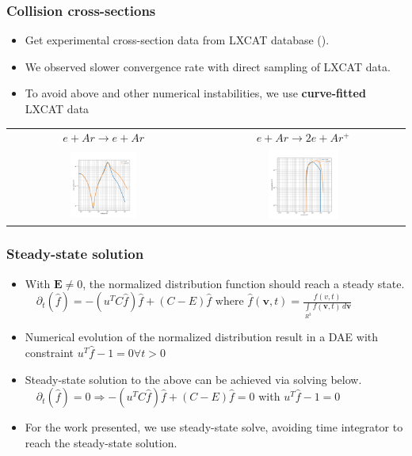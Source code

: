 \documentclass[mathserif, aspectratio=169]{beamer}
\newcommand{\vect}[1]{\boldsymbol{#1}}
\newcommand{\myint}{\int\limits}
\newcommand{\diff}[1]{\, d#1}
\begin{document}
\begin{frame}
	\frametitle{Collision cross-sections}
	\begin{itemize}
		\item Get experimental cross-section data from LXCAT database (). 
		\item We observed slower convergence rate with direct sampling of LXCAT data. 
		\item To avoid above and other numerical instabilities, we use \textbf{curve-fitted} LXCAT data%
	\end{itemize}
	\begin{center}
		\begin{tabular}{cc}
			$e + Ar \rightarrow e + Ar $ & $e + Ar \rightarrow 2e + Ar^+ $ \\
			\includegraphics[width=0.36\textwidth]{fig/g0.png} &  \includegraphics[width=0.36\textwidth]{fig/g2.png}
		\end{tabular}	
	\end{center}
\end{frame}


\begin{frame}
	\frametitle{Steady-state solution}
	\begin{itemize}
		\item With $\vect{E}\neq 0$, the normalized distribution function should reach a steady state. 
		$
		\displaystyle
		\quad
		\partial_t (\hat{f}) = -(u^T C \hat{f}) \hat{f} + (C-E)\hat{f} \text{ where } \hat{f}(\vect{v},t) = \frac{f(v,t)}{\myint_{R^3} f(\vect{v},t) \diff{\vect{v}}}
		$
		\item Numerical evolution of the normalized distribution result in a DAE with constraint $u^T \hat{f}-1=0 \forall t>0$
		\item Steady-state solution to the above can be achieved via solving below.  
		$
		\displaystyle
		\quad
		\partial_t (\hat{f}) = 0 \Rightarrow -(u^T C \hat{f}) \hat{f} + (C-E)\hat{f} =0
		$ with $u^T \hat{f}-1=0$
		\item For the work presented, we use steady-state solve, avoiding time integrator to reach the steady-state solution. 
	\end{itemize}
\end{frame}
\end{document}
